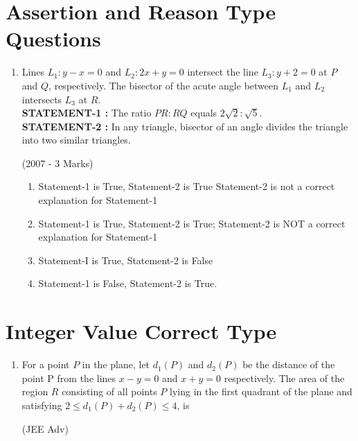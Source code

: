 \documentclass[journal,12pt,twocolumn]{IEEEtran}
\theoremstyle{remark}
\begin{document}
\section{Assertion and Reason Type Questions} 
\begin{enumerate}
\item Lines $L_{1}: y-x=0$ and $L_{2}: 2x+y=0$ intersect the line $L_{3}: y+2=0$ at $P$ and $Q$, respectively. The bisector of the acute 
angle between $L_{1}$ and $L_{2}$ intersects $L_{3}$ at $R$.\\
\textbf{STATEMENT-1 :} The ratio $PR:RQ$ equals $2\sqrt{2}:\sqrt{5}$.\\
\textbf{STATEMENT-2 :} In any triangle, bisector of an angle divides the triangle into two similar triangles.

\hfill{(2007 - 3 Marks)}
   \begin{enumerate}[label=(\alph*)]
   \item Statement-1 is True, Statement-2 is True Statement-2 
is not a correct explanation for Statement-1 
   \item Statement-1 is True, Statement-2 is True; Statement-2 
is NOT a correct explanation for Statement-1 
   \item Statement-I is True, Statement-2 is False
   \item Statement-1 is False, Statement-2 is True. 
   \end{enumerate}
\end{enumerate}

\section{Integer Value Correct Type}
\begin{enumerate}
\item For a point $P$ in the plane, let $d_{1}(P)$ and $d_{2}(P)$ be the 
distance of the point P from the lines $x-y=0$ and $x+y =0$ 
respectively. The area of the region $R$ consisting of all points 
$P$ lying in the first quadrant of the plane and satisfying
$2\leq d_{1}(P)+d_{2}(P) \leq4$, is

		\hfill{(JEE Adv)}
\end{enumerate}
\end{document}
